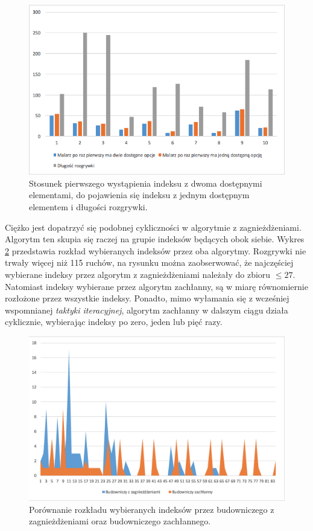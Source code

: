 \documentclass[document]{xmgr}
\begin{document}
\begin{figure}[H]
    \centering
    \includegraphics[scale = 0.7]{images/builder0efficiency}
    \caption{Stosunek pierwszego wystąpienia indeksu z dwoma dostępnymi elementami, do pojawienia się indeksu z jednym dostępnym elementem i długości rozgrywki.}
    \label{fig:builder0Efficiency}
\end{figure}

Ciężko jest dopatrzyć się podobnej cykliczności w algorytmie z zagnieżdżeniami. Algorytm ten skupia się raczej na grupie indeksów będących obok siebie. Wykres \ref{fig:buildersPickedIndexes} przedstawia rozkład wybieranych indeksów przez oba algorytmy. Rozgrywki nie trwały więcej niż 115 ruchów, na rysunku można zaobserwować, że najczęściej wybierane indeksy przez algorytm z zagnieżdżeniami należały do zbioru $\leq 27$. Natomiast indeksy wybierane przez algorytm zachłanny, są w miarę równomiernie rozłożone przez wszystkie indeksy. Ponadto, mimo wyłamania się z wcześniej wspomnianej \textit{taktyki iteracyjnej}, algorytm zachłanny w dalszym ciągu działa cyklicznie, wybierając indeksy po zero, jeden lub pięć razy.

\begin{figure}[h]
    \centering
    \includegraphics[scale = 0.6]{images/buildersPickedIndexes}
    \caption{Porównanie rozkładu wybieranych indeksów przez budowniczego z zagnieżdżeniami oraz budowniczego zachłannego.}
    \label{fig:buildersPickedIndexes}
\end{figure}
\end{document}
